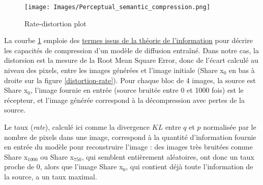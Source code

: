 \documentclass{article}
\begin{document}
\begin{adjustwidth}{-0.8cm}{0cm}
\begin{minipage}{.45\textwidth}
\vspace{-0.8cm}
\begin{figure}[H]
    \centering
    \texttt{[image: Images/Perceptual\_semantic\_compression.png]}
    \caption{Rate-distortion plot}
    \label{perceptual-semantic-compression}
\end{figure}
\end{minipage}
\begin{minipage}{.04\textwidth}
    \text{\hfill}
\end{minipage}
\begin{minipage}{.55\textwidth}
\setlength{\parindent}{1.5em}
La courbe \ref{perceptual-semantic-compression} emploie des \href{https://en.wikipedia.org/wiki/Rate%E2%80%93distortion_theory}{termes issus de la théorie de l'information} pour décrire les capacités de compression d'un modèle de diffusion entraîné. Dans notre cas, la distorsion est la mesure de la Root Mean Square Error, donc de l'écart calculé au niveau des pixels, entre les images générées et l'image initiale (Share x$_0$ en bas à droite sur la figure \ref{distortion-rate}). Pour chaque bloc de 4 images, la source est Share x$_0$, l'image fournie en entrée (source bruitée entre 0 et 1000 fois) est le récepteur, et l'image générée correspond à la décompression avec pertes de la source. \par
Le taux (\textit{rate}), calculé ici comme la divergence $KL$ entre $q$ et $p$ normalisée par le nombre de pixels dans une image, correspond à la quantité d'information fournie en entrée du modèle pour reconstruire l'image : des images très bruitées comme Share x$_{1000}$ ou Share x$_{750}$, qui semblent entièrement aléatoires, ont donc un taux proche de 0, alors que l'image Share x$_0$, qui contient déjà toute l'information de la source, a un taux maximal.
\vspace{0.4cm}
\end{minipage}
\end{adjustwidth}
\end{document}

